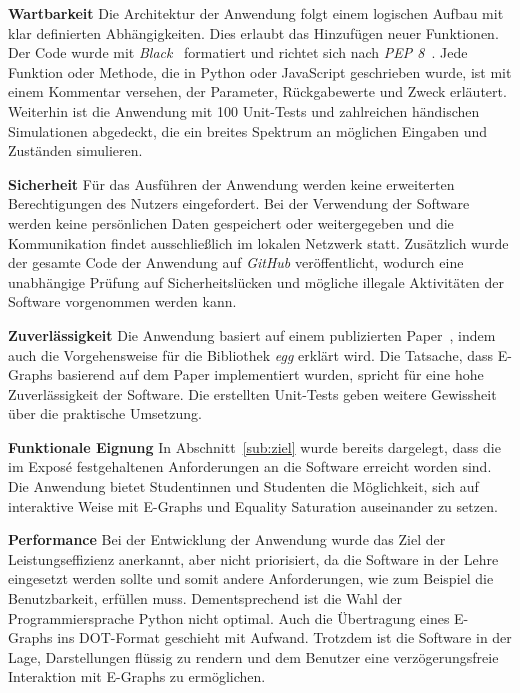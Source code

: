 \noindent\textbf{Wartbarkeit} Die Architektur der Anwendung folgt einem logischen Aufbau mit klar definierten Abhängigkeiten. Dies erlaubt das Hinzufügen neuer Funktionen.
Der Code wurde mit \textit{Black}~\cite{black} formatiert und richtet sich nach \textit{PEP 8}~\cite{pep}. Jede Funktion oder Methode, die in Python oder JavaScript geschrieben wurde, 
ist mit einem Kommentar versehen, der Parameter, Rückgabewerte und Zweck erläutert. Weiterhin ist die Anwendung mit 100 Unit-Tests und zahlreichen händischen Simulationen abgedeckt, die ein breites Spektrum an 
möglichen Eingaben und Zuständen simulieren.

\noindent\textbf{Sicherheit} Für das Ausführen der Anwendung werden keine erweiterten Berechtigungen des Nutzers eingefordert. Bei der Verwendung der Software werden keine persönlichen Daten gespeichert 
oder weitergegeben und die Kommunikation findet ausschließlich im lokalen Netzwerk statt.
Zusätzlich wurde der gesamte Code der Anwendung auf \textit{GitHub} veröffentlicht, wodurch eine unabhängige Prüfung auf Sicherheitslücken und mögliche illegale Aktivitäten der Software vorgenommen werden kann.

\noindent\textbf{Zuverlässigkeit} Die Anwendung basiert auf einem publizierten Paper~\cite{2021-egg}, indem auch die Vorgehensweise für die Bibliothek \textit{egg} erklärt wird.
Die Tatsache, dass E-Graphs basierend auf dem Paper implementiert wurden, spricht für eine hohe Zuverlässigkeit der Software.
Die erstellten Unit-Tests geben weitere Gewissheit über die praktische Umsetzung.


\noindent\textbf{Funktionale Eignung} In Abschnitt~\ref{sub:ziel} wurde bereits dargelegt, dass die im Exposé festgehaltenen Anforderungen an die Software erreicht worden sind.
Die Anwendung bietet Studentinnen und Studenten die Möglichkeit, sich auf interaktive Weise mit E-Graphs und Equality Saturation auseinander zu setzen.





\noindent\textbf{Performance} Bei der Entwicklung der Anwendung wurde das Ziel der Leistungseffizienz anerkannt, aber nicht priorisiert, da die Software in der Lehre eingesetzt werden sollte
und somit andere Anforderungen, wie zum Beispiel die Benutzbarkeit, erfüllen muss. Dementsprechend ist die Wahl der Programmiersprache Python nicht optimal. Auch die Übertragung eines E-Graphs ins DOT-Format 
geschieht mit Aufwand. Trotzdem ist die Software in der Lage, Darstellungen flüssig zu rendern und dem Benutzer eine verzögerungsfreie Interaktion mit E-Graphs zu ermöglichen.

